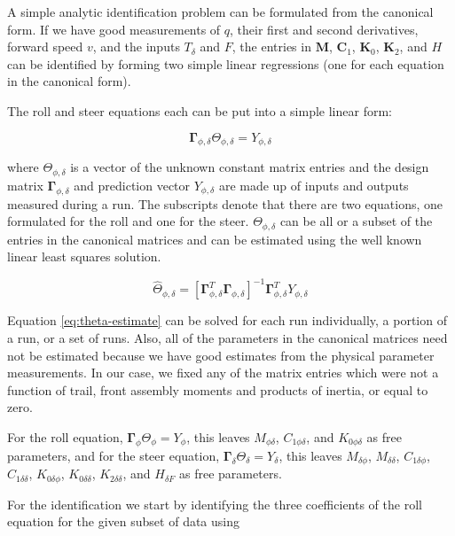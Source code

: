 \documentclass[a4paper]{article}
\begin{document}
A simple analytic identification problem can be formulated from the canonical
form. If we have good measurements of $q$, their first and second derivatives,
forward speed $v$, and the inputs $T_\delta$ and $F$, the entries in
$\mathbf{M}$, $\mathbf{C}_1$, $\mathbf{K}_0$, $\mathbf{K}_2$, and $H$ can be
identified by forming two simple linear regressions (one for each equation
in the canonical form).

The roll and steer equations each can be put into a simple linear form:

\begin{equation}
  \mathbf{\Gamma}_{\phi,\delta} \Theta_{\phi,\delta} = Y_{\phi,\delta}
\end{equation}

where $\Theta_{\phi,\delta}$ is a vector of the unknown constant matrix entries
and the design matrix $\mathbf{\Gamma}_{\phi,\delta}$ and prediction vector
$Y_{\phi,\delta}$ are made up of inputs and outputs measured during a run. The
subscripts denote that there are two equations, one formulated for the roll and
one for the steer.  $\Theta_{\phi,\delta}$ can be all or a subset of the
entries in the canonical matrices and can be estimated using the well known
linear least squares solution.

\begin{equation}
  \hat{\Theta}_{\phi,\delta} = [\mathbf{\Gamma}_{\phi,\delta}^T \mathbf{\Gamma}_{\phi,\delta}]^{-1} \mathbf{\Gamma}_{\phi,\delta}^T Y_{\phi,\delta}
  \label{eq:theta-estimate}
\end{equation}

Equation \ref{eq:theta-estimate} can be solved for each run individually, a
portion of a run, or a set of runs. Also, all of the parameters in the
canonical matrices need not be estimated because we have good estimates from
the physical parameter measurements. In our case, we fixed any of the matrix
entries which were not a function of trail, front assembly moments and products
of inertia, or equal to zero.

For the roll equation, $\mathbf{\Gamma}_{\phi} \Theta_{\phi} = Y_{\phi}$, this
leaves $M_{\phi\delta}$, $C_{1\phi\delta}$, and $K_{0\phi\delta}$ as free
parameters, and for the steer equation, $\mathbf{\Gamma}_{\delta}
\Theta_{\delta} = Y_{\delta}$, this leaves $M_{\delta\phi}$,
$M_{\delta\delta}$, $C_{1\delta\phi}$, $C_{1\delta\delta}$, $K_{0\delta\phi}$,
$K_{0\delta\delta}$, $K_{2\delta\delta}$, and $H_{\delta F}$ as free
parameters.

For the identification we start by identifying the three coefficients of the
roll equation for the given subset of data using
\end{document}
